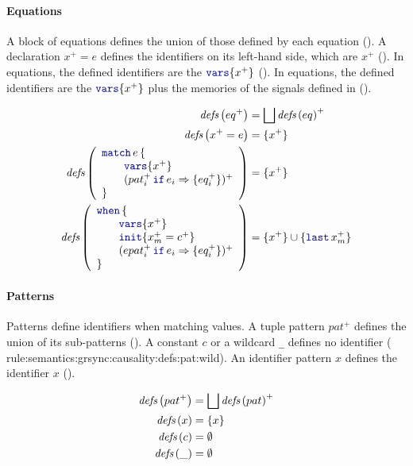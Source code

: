 \paragraph{Equations}

A block of equations defines the union of those defined by each equation (). A declaration $x^+ = e$ defines the identifiers on its left-hand
side, which are $x^+$ (). In 
equations, the defined identifiers are the $\kwf{vars}\{x^+\}$ (). In  equations, the defined identifiers are the
$\kwf{vars}\{x^+\}$ plus the memories of the signals defined in  ().

\begin{align}
    \defs{eq^+}                                                           & = \bigsqcup \defs{eq}^+ \label{rule:semantics:grsync:causality:defs:eq}              \\
    \defs{x^+ = e}                                                        & = \{x^+\} \label{rule:semantics:grsync:causality:defs:eq:decl}                       \\
    \defs{\matchTab{e}{x^+}{(\branch{pat_i^+}{e_i}{eq_i^+})^+}}           & = \{x^+\} \label{rule:semantics:grsync:causality:defs:eq:match}                      \\
    \defs{\whenTab{x^+}{x_m^+ = c^+}{(\branch{epat_i^+}{e_i}{eq_i^+})^+}} & = \{x^+\} \cup \{\last{x_m}^+\} \label{rule:semantics:grsync:causality:defs:eq:when}
\end{align}

\paragraph{Patterns}

Patterns define identifiers when matching values. A tuple pattern $pat^+$ defines the union of its
sub-patterns (). A constant $c$ or a wildcard
\verb|_| defines no identifier (%
{rule:semantics:grsync:causality:defs:pat:wild}). An identifier pattern $x$ defines the
identifier $x$ ().

\begin{align}
    {\ensuremath{\textit{defs}\left(pat^+\right)}} & = \bigsqcup {\ensuremath{\textit{defs}\left(pat\right)}}^+ \label{rule:semantics:grsync:causality:defs:pat} \\
    {\textit{defs}\left(x\right)}     & = \{x\} \label{rule:semantics:grsync:causality:defs:pat:ident}            \\
    {\textit{defs}\left(c\right)}     & = \emptyset \label{rule:semantics:grsync:causality:defs:pat:const}        \\
    {\textit{defs}\left(\_\right)}    & = \emptyset \label{rule:semantics:grsync:causality:defs:pat:wild}
\end{align}

